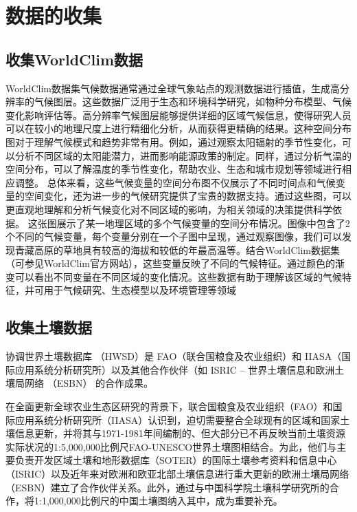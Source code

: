 \documentclass[AutoFakeBold]{LZUThesis-PgD&PhD}
\begin{document}
        \section{数据的收集}
        \subsection{收集WorldClim数据}
	
        WorldClim数据集气候数据通常通过全球气象站点的观测数据进行插值，生成高分辨率的气候图层。这些数据广泛用于生态和环境科学研究，如物种分布模型、气候变化影响评估等。高分辨率气候图层能够提供详细的区域气候信息，使得研究人员可以在较小的地理尺度上进行精细化分析，从而获得更精确的结果。这种空间分布图对于理解气候模式和趋势非常有用。例如，通过观察太阳辐射的季节性变化，可以分析不同区域的太阳能潜力，进而影响能源政策的制定。同样，通过分析气温的空间分布，可以了解温度的季节性变化，帮助农业、生态和城市规划等领域进行相应调整。
        总体来看，这些气候变量的空间分布图不仅展示了不同时间点和气候变量的空间变化，还为进一步的气候研究提供了宝贵的数据支持。通过这些图，可以更直观地理解和分析气候变化对不同区域的影响，为相关领域的决策提供科学依据。 这张图展示了某一地理区域的多个气候变量的空间分布情况。图像中包含了2个不同的气候变量，每个变量分别在一个子图中呈现，通过观察图像，我们可以发现青藏高原的草地具有较高的海拔和较低的年最高温等。结合WorldClim数据集（可参见WorldClim官方网站），这些变量反映了不同的气候特征。通过颜色的渐变可以看出不同变量在不同区域的变化情况。这些数据有助于理解该区域的气候特征，并可用于气候研究、生态模型以及环境管理等领域
        
        \subsection{收集土壤数据}
        
        
        协调世界土壤数据库 （HWSD）是 FAO（联合国粮食及农业组织）和 IIASA（国际应用系统分析研究所）以及其他合作伙伴（如 ISRIC – 世界土壤信息和欧洲土壤局网络 （ESBN） 的合作成果。
        
        在全面更新全球农业生态区研究的背景下，联合国粮食及农业组织（FAO）和国际应用系统分析研究所（IIASA）认识到，迫切需要整合全球现有的区域和国家土壤信息更新，并将其与1971-1981年间编制的、但大部分已不再反映当前土壤资源实际状况的1:5,000,000比例尺FAO-UNESCO世界土壤图相结合。为此，他们与主要负责开发区域土壤和地形数据库（SOTER）的国际土壤参考资料和信息中心（ISRIC）以及近年来对欧洲和欧亚北部土壤信息进行重大更新的欧洲土壤局网络（ESBN）建立了合作伙伴关系。此外，通过与中国科学院土壤科学研究所的合作，将1:1,000,000比例尺的中国土壤图纳入其中，成为重要补充。
        
\end{document}
